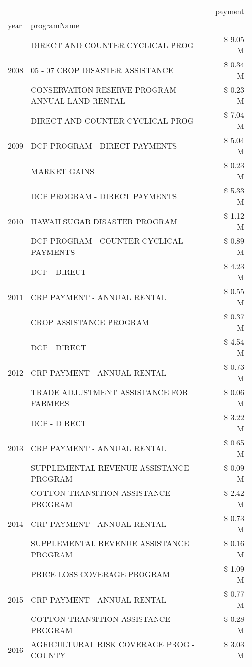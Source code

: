 \begin{tabular}{llr}
\toprule
 &  & payment \\
year & programName &  \\
\midrule
\multirow[t]{3}{*}{2008} & DIRECT AND COUNTER CYCLICAL PROG & \$ 9.05 M \\
 & 05 - 07 CROP DISASTER ASSISTANCE & \$ 0.34 M \\
 & CONSERVATION RESERVE PROGRAM - ANNUAL LAND RENTAL & \$ 0.23 M \\
\cline{1-3}
\multirow[t]{3}{*}{2009} & DIRECT AND COUNTER CYCLICAL PROG & \$ 7.04 M \\
 & DCP PROGRAM - DIRECT PAYMENTS & \$ 5.04 M \\
 & MARKET GAINS & \$ 0.23 M \\
\cline{1-3}
\multirow[t]{3}{*}{2010} & DCP PROGRAM - DIRECT PAYMENTS & \$ 5.33 M \\
 & HAWAII SUGAR DISASTER PROGRAM & \$ 1.12 M \\
 & DCP PROGRAM - COUNTER CYCLICAL PAYMENTS & \$ 0.89 M \\
\cline{1-3}
\multirow[t]{3}{*}{2011} & DCP - DIRECT & \$ 4.23 M \\
 & CRP PAYMENT - ANNUAL RENTAL & \$ 0.55 M \\
 & CROP ASSISTANCE PROGRAM & \$ 0.37 M \\
\cline{1-3}
\multirow[t]{3}{*}{2012} & DCP - DIRECT & \$ 4.54 M \\
 & CRP PAYMENT - ANNUAL RENTAL & \$ 0.73 M \\
 & TRADE ADJUSTMENT ASSISTANCE FOR FARMERS & \$ 0.06 M \\
\cline{1-3}
\multirow[t]{3}{*}{2013} & DCP - DIRECT & \$ 3.22 M \\
 & CRP PAYMENT - ANNUAL RENTAL & \$ 0.65 M \\
 & SUPPLEMENTAL REVENUE ASSISTANCE PROGRAM & \$ 0.09 M \\
\cline{1-3}
\multirow[t]{3}{*}{2014} & COTTON TRANSITION ASSISTANCE PROGRAM & \$ 2.42 M \\
 & CRP PAYMENT - ANNUAL RENTAL & \$ 0.73 M \\
 & SUPPLEMENTAL REVENUE ASSISTANCE PROGRAM & \$ 0.16 M \\
\cline{1-3}
\multirow[t]{3}{*}{2015} & PRICE LOSS COVERAGE PROGRAM & \$ 1.09 M \\
 & CRP PAYMENT - ANNUAL RENTAL & \$ 0.77 M \\
 & COTTON TRANSITION ASSISTANCE PROGRAM & \$ 0.28 M \\
\cline{1-3}
\multirow[t]{3}{*}{2016} & AGRICULTURAL RISK COVERAGE PROG - COUNTY & \$ 3.03 M \\

\end{tabular}
